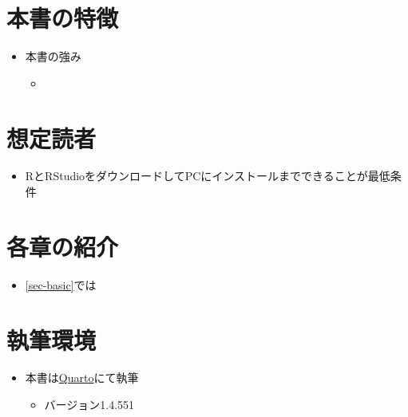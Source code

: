 \documentclass[
  b5paper,
  xelatex, ja=standard]{bxjsbook}
\providecommand{\tightlist}{%
  \setlength{\itemsep}{0pt}\setlength{\parskip}{0pt}}\usepackage{longtable,booktabs,array}
\begin{document}
\section*{本書の特徴}\label{ux672cux66f8ux306eux7279ux5fb4}


\begin{itemize}
\tightlist
\item
  本書の強み

  \begin{itemize}
  \tightlist
  \item
  \end{itemize}
\end{itemize}

\section*{想定読者}\label{ux60f3ux5b9aux8aadux8005}


\begin{itemize}
\tightlist
\item
  RとRStudioをダウンロードしてPCにインストールまでできることが最低条件
\end{itemize}

\section*{各章の紹介}\label{ux5404ux7ae0ux306eux7d39ux4ecb}


\begin{itemize}
\tightlist
\item
  \ref{sec-basic}では
\end{itemize}

\section*{執筆環境}\label{ux57f7ux7b46ux74b0ux5883}


\begin{itemize}
\tightlist
\item
  本書は\href{https://quarto.org/}{Quarto}にて執筆

  \begin{itemize}
  \tightlist
  \item
    バージョン1.4.551
  \end{itemize}
\end{itemize}
\end{document}
